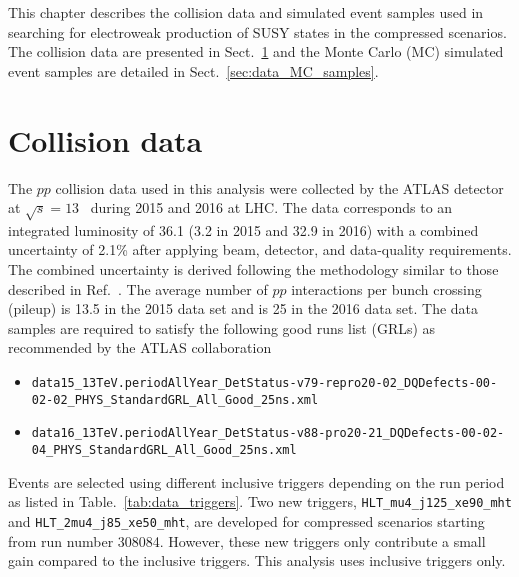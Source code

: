 This chapter describes the collision data and simulated event samples used in searching for electroweak production of SUSY states in the compressed scenarios.
The collision data are presented in Sect.~\ref{sec:data_collision_data} and the Monte Carlo (MC) simulated event samples are detailed in Sect.~\ref{sec:data_MC_samples}.


\section{Collision data}
\label{sec:data_collision_data}
The $pp$ collision data used in this analysis were collected by the ATLAS detector at $\sqrt{s} = 13$~{\TeV} during 2015 and 2016 at LHC.
The data corresponds to an integrated luminosity of 36.1 \ifb (3.2 \ifb in 2015 and 32.9 \ifb in 2016) with a combined uncertainty of 2.1\% after applying beam, detector, and data-quality requirements.
The combined uncertainty is derived following the methodology similar to those described in Ref.~\cite{Aaboud:2016hhf}.
The average number of $pp$ interactions per bunch crossing (pileup) is 13.5 in the 2015 data set and is 25 in the 2016 data set.
The data samples are required to satisfy the following good runs list (GRLs) as recommended by the ATLAS collaboration
%
\begin{itemize}
    \item {\tiny \texttt{data15\_13TeV.periodAllYear\_DetStatus-v79-repro20-02\_DQDefects-00-02-02\_PHYS\_StandardGRL\_All\_Good\_25ns.xml}}
    \item {\tiny \texttt{data16\_13TeV.periodAllYear\_DetStatus-v88-pro20-21\_DQDefects-00-02-04\_PHYS\_StandardGRL\_All\_Good\_25ns.xml}}
\end{itemize}
%
Events are selected using different inclusive \met triggers depending on the run period as listed in Table.~\ref{tab:data_triggers}.
Two new triggers, \texttt{HLT\_mu4\_j125\_xe90\_mht} and \texttt{HLT\_2mu4\_j85\_xe50\_mht}, are developed for compressed scenarios starting from run number 308084.
However, these new triggers only contribute a small gain compared to the inclusive \met triggers.
This analysis uses inclusive \met triggers only.

